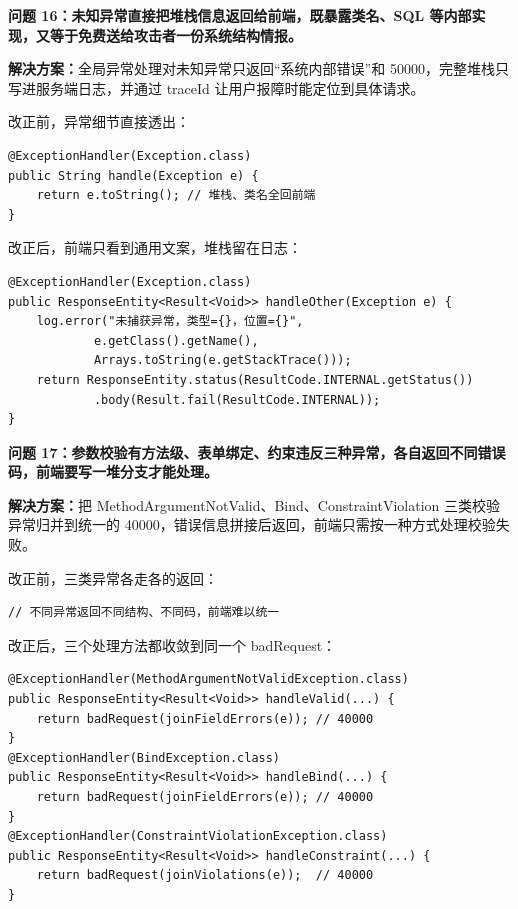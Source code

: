 \documentclass[zihao=-4,UTF8,openany]{ctexart}
\renewcommand{\_}{\textunderscore\allowbreak}
\begin{document}
\noindent\textbf{问题 16：未知异常直接把堆栈信息返回给前端，既暴露类名、SQL 等内部实现，又等于免费送给攻击者一份系统结构情报。}

\textbf{解决方案：}全局异常处理对未知异常只返回“系统内部错误”和 50000，完整堆栈只写进服务端日志，并通过 traceId 让用户报障时能定位到具体请求。

改正前，异常细节直接透出：

\begin{lstlisting}
@ExceptionHandler(Exception.class)
public String handle(Exception e) {
    return e.toString(); // 堆栈、类名全回前端
}
\end{lstlisting}

改正后，前端只看到通用文案，堆栈留在日志：

\begin{lstlisting}
@ExceptionHandler(Exception.class)
public ResponseEntity<Result<Void>> handleOther(Exception e) {
    log.error("未捕获异常，类型={}，位置={}",
            e.getClass().getName(),
            Arrays.toString(e.getStackTrace()));
    return ResponseEntity.status(ResultCode.INTERNAL.getStatus())
            .body(Result.fail(ResultCode.INTERNAL));
}
\end{lstlisting}

\noindent\textbf{问题 17：参数校验有方法级、表单绑定、约束违反三种异常，各自返回不同错误码，前端要写一堆分支才能处理。}

\textbf{解决方案：}把 MethodArgumentNotValid、Bind、ConstraintViolation 三类校验异常归并到统一的 40000，错误信息拼接后返回，前端只需按一种方式处理校验失败。

改正前，三类异常各走各的返回：

\begin{lstlisting}[language={},numbers=none]
// 不同异常返回不同结构、不同码，前端难以统一
\end{lstlisting}

改正后，三个处理方法都收敛到同一个 badRequest：

\begin{lstlisting}
@ExceptionHandler(MethodArgumentNotValidException.class)
public ResponseEntity<Result<Void>> handleValid(...) {
    return badRequest(joinFieldErrors(e)); // 40000
}
@ExceptionHandler(BindException.class)
public ResponseEntity<Result<Void>> handleBind(...) {
    return badRequest(joinFieldErrors(e)); // 40000
}
@ExceptionHandler(ConstraintViolationException.class)
public ResponseEntity<Result<Void>> handleConstraint(...) {
    return badRequest(joinViolations(e));  // 40000
}
\end{lstlisting}
\end{document}
